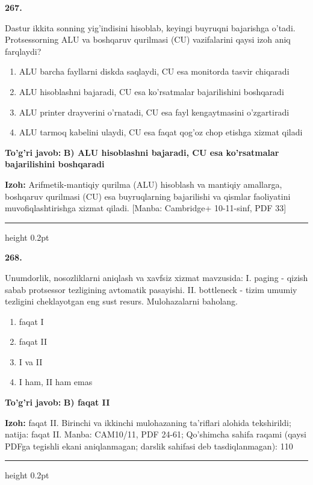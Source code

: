 \documentclass[10pt,a4paper]{article}
\begin{document}
{\bfseries\sffamily\color{ink} 267.}
\par
Dastur ikkita sonning yig'indisini hisoblab, keyingi buyruqni bajarishga o'tadi. Protsessorning ALU va boshqaruv qurilmasi (CU) vazifalarini qaysi izoh aniq farqlaydi?
\begin{enumerate}[label=\Alph*),leftmargin=9mm]
\item ALU barcha fayllarni diskda saqlaydi, CU esa monitorda tasvir chiqaradi
\item ALU hisoblashni bajaradi, CU esa ko'rsatmalar bajarilishini boshqaradi
\item ALU printer drayverini o'rnatadi, CU esa fayl kengaytmasini o'zgartiradi
\item ALU tarmoq kabelini ulaydi, CU esa faqat qog'oz chop etishga xizmat qiladi
\end{enumerate}
\begin{tcolorbox}[enhanced,breakable,colback=teal!4,colframe=teal!60!black,boxrule=0.45pt,arc=1.2mm,left=2.7mm,right=2.7mm,top=1.8mm,bottom=1.8mm,before skip=2mm,after skip=2mm]
{\bfseries\sffamily\color{teal}To'g'ri javob:} \textbf{B) ALU hisoblashni bajaradi, CU esa ko'rsatmalar bajarilishini boshqaradi}
\par\smallskip
{\bfseries Izoh:} Arifmetik-mantiqiy qurilma (ALU) hisoblash va mantiqiy amallarga, boshqaruv qurilmasi (CU) esa buyruqlarning bajarilishi va qismlar faoliyatini muvofiqlashtirishga xizmat qiladi. [Manba: Cambridge+ 10-11-sinf, PDF 33]
\end{tcolorbox}
\vspace{2mm}\hrule height 0.2pt\vspace{3mm}

{\bfseries\sffamily\color{ink} 268.}
\par
Unumdorlik, nosozliklarni aniqlash va xavfsiz xizmat mavzusida: I. paging - qizish sabab protsessor tezligining avtomatik pasayishi. II. bottleneck - tizim umumiy tezligini cheklayotgan eng sust resurs. Mulohazalarni baholang.
\begin{enumerate}[label=\Alph*),leftmargin=9mm]
\item faqat I
\item faqat II
\item I va II
\item I ham, II ham emas
\end{enumerate}
\begin{tcolorbox}[enhanced,breakable,colback=teal!4,colframe=teal!60!black,boxrule=0.45pt,arc=1.2mm,left=2.7mm,right=2.7mm,top=1.8mm,bottom=1.8mm,before skip=2mm,after skip=2mm]
{\bfseries\sffamily\color{teal}To'g'ri javob:} \textbf{B) faqat II}
\par\smallskip
{\bfseries Izoh:} faqat II. Birinchi va ikkinchi mulohazaning ta'riflari alohida tekshirildi; natija: faqat II. Manba: CAM10/11, PDF 24-61; Qo'shimcha sahifa raqami (qaysi PDFga tegishli ekani aniqlanmagan; darslik sahifasi deb tasdiqlanmagan): 110
\end{tcolorbox}
\vspace{2mm}\hrule height 0.2pt\vspace{3mm}
\end{document}
